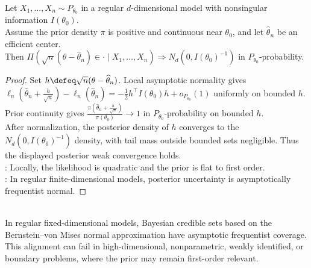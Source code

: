 \begin{theorem} \label{thm:bernstein-von-mises-informal} \\
Let $X_1,\ldots,X_n\sim P_{\theta_0}$ in a regular $d$-dimensional model with nonsingular information $I(\theta_0)$.\\
Assume the prior density $\pi$ is positive and continuous near $\theta_0$, and let $\widehat{\theta}_n$ be an efficient center.\\
Then $\Pi(\sqrt{n}(\theta-\widehat{\theta}_n)\in\cdot\mid X_1,\ldots,X_n)\Rightarrow N_d(0,I(\theta_0)^{-1})$ in $P_{\theta_0}$-probability.
\begin{proof} Set $h\defeq\sqrt{n}(\theta-\widehat{\theta}_n)$. Local asymptotic normality gives $\ell_n(\widehat{\theta}_n+\frac{h}{\sqrt{n}})-\ell_n(\widehat{\theta}_n)=-\frac12h^\top I(\theta_0)h+o_{P_{\theta_0}}(1)$ uniformly on bounded $h$. Prior continuity gives $\frac{\pi(\widehat{\theta}_n+\frac{h}{\sqrt{n}})}{\pi(\theta_0)}\to1$ in $P_{\theta_0}$-probability on bounded $h$.\\
After normalization, the posterior density of $h$ converges to the $N_d(0,I(\theta_0)^{-1})$ density, with tail mass outside bounded sets negligible. Thus the displayed posterior weak convergence holds.\\
: Locally, the likelihood is quadratic and the prior is flat to first order.\\
: In regular finite-dimensional models, posterior uncertainty is asymptotically frequentist normal.
\end{proof}
\end{theorem}

\begin{remark} \label{rem:bayes-frequentist-alignment-and-limits} \\
In regular fixed-dimensional models, Bayesian credible sets based on the Bernstein--von Mises normal approximation have asymptotic frequentist coverage. This alignment can fail in high-dimensional, nonparametric, weakly identified, or boundary problems, where the prior may remain first-order relevant.
\end{remark}
